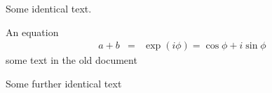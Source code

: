 Some identical text.

An equation
\begin{eqnarray}
a + b & = & \exp(i\phi)=\cos \phi + i \sin \phi
\end{eqnarray}
some text in the old document

Some further identical text

